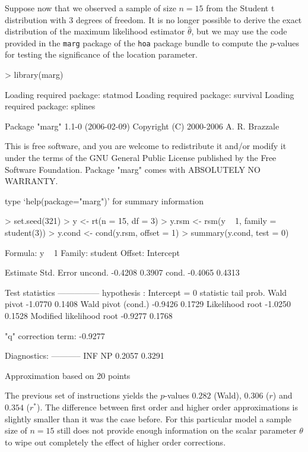 \documentclass[a4paper,11pt]{article}
\def\code{\texttt}
\begin{document}
Suppose now that we observed a sample of size $n = 15$ from the Student t distribution with $3$ degrees of freedom.  It is no longer possible to derive the exact distribution of the maximum likelihood estimator $\hat\theta$, but we may use the code provided in the \code{marg} package of the \code{hoa} package bundle to compute the $p$-values for testing the significance of the location parameter.  

\begin{Schunk}
\begin{Sinput}
> library(marg)
\end{Sinput}
\begin{Soutput}
Loading required package: statmod
Loading required package: survival
Loading required package: splines

   Package "marg" 1.1-0 (2006-02-09) 
   Copyright (C) 2000-2006 A. R. Brazzale

This is free software, and you are welcome to redistribute
it and/or modify it under the terms of the GNU General
Public License published by the Free Software Foundation.
Package "marg" comes with ABSOLUTELY NO WARRANTY.

type `help(package="marg")' for summary information
\end{Soutput}
\begin{Sinput}
> set.seed(321)
> y <- rt(n = 15, df = 3)
> y.rsm <- rsm(y ~ 1, family = student(3))
> y.cond <- cond(y.rsm, offset = 1)
> summary(y.cond, test = 0)
\end{Sinput}
\begin{Soutput}
 Formula:  y ~ 1
 Family:  student
 Offset:  Intercept

          Estimate   Std. Error 
uncond.     -0.4208       0.3907
cond.       -0.4065       0.4313

Test statistics
---------------
 hypothesis : Intercept = 0 
                           statistic  tail prob.
Wald pivot                   -1.0770      0.1408
Wald pivot (cond.)           -0.9426      0.1729
Likelihood root              -1.0250      0.1528
Modified likelihood root     -0.9277      0.1768
                            
"q" correction term: -0.9277

Diagnostics:
----------- 
   INF     NP 
0.2057 0.3291 

 Approximation based on 20 points
\end{Soutput}
\end{Schunk}

The previous set of instructions yields the $p$-values $0.282$ (Wald), $0.306$ ($r$) and $0.354$ ($r^*$).  The difference between first order and higher order approximations is slightly smaller than it was the case before.  For this particular model a sample size of $n=15$ still does not provide enough information on the scalar parameter $\theta$ to wipe out completely the effect of higher order corrections. 
\end{document}
